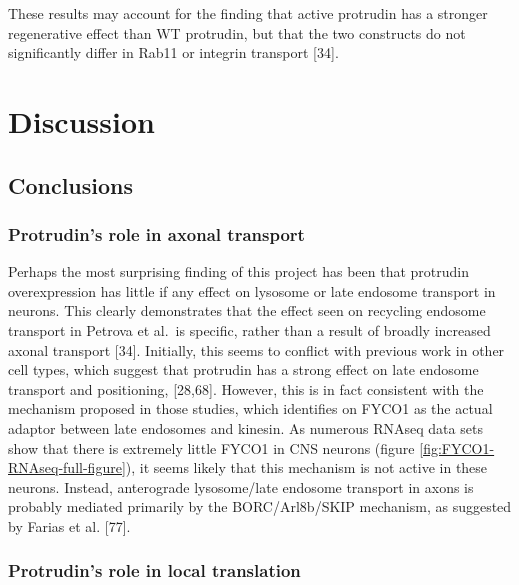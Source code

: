 \documentclass[
  12pt,
  a4paper,
]{book}
\begin{document}
These results may account for the finding that active protrudin has a stronger regenerative effect than WT protrudin, but that the two constructs do not significantly differ in Rab11 or integrin transport {[}34{]}.

\hypertarget{DISCUSSION}{%
\chapter*{Discussion}\label{DISCUSSION}}

\setcounter{chapter}{4}
\setcounter{section}{0}

\hypertarget{conclusions}{%
\section{Conclusions}\label{conclusions}}

\hypertarget{protrudins-role-in-axonal-transport}{%
\subsection{Protrudin's role in axonal transport}\label{protrudins-role-in-axonal-transport}}

Perhaps the most surprising finding of this project has been that protrudin overexpression has little if any effect on lysosome or late endosome transport in neurons. This clearly demonstrates that the effect seen on recycling endosome transport in Petrova et al.~is specific, rather than a result of broadly increased axonal transport {[}34{]}. Initially, this seems to conflict with previous work in other cell types, which suggest that protrudin has a strong effect on late endosome transport and positioning, {[}28,68{]}. However, this is in fact consistent with the mechanism proposed in those studies, which identifies on FYCO1 as the actual adaptor between late endosomes and kinesin. As numerous RNAseq data sets show that there is extremely little FYCO1 in CNS neurons (figure \ref{fig:FYCO1-RNAseq-full-figure}), it seems likely that this mechanism is not active in these neurons. Instead, anterograde lysosome/late endosome transport in axons is probably mediated primarily by the BORC/Arl8b/SKIP mechanism, as suggested by Farias et al. {[}77{]}.

\hypertarget{protrudins-role-in-local-translation}{%
\subsection{Protrudin's role in local translation}\label{protrudins-role-in-local-translation}}
\end{document}
